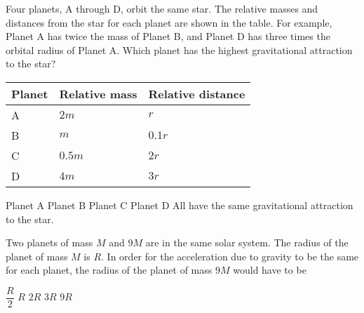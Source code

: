 \documentclass{../../oss-apphys-exam}
\begin{document}
\begin{multicols*}{2}
\begin{questions}
    \question Four planets, A through D, orbit the same star. The relative
    masses and distances from the star for each planet are shown in the table.
    For example, Planet A has twice the mass of Planet B, and Planet D has
    three times the orbital radius of Planet A. Which planet has the highest
    gravitational attraction to the star?
    \begin{center}
      \vspace{-.1in}
      \begin{tabular}{lll}
        \hline
        \textbf{Planet} & \textbf{Relative mass} & \textbf{Relative distance}\\
        \hline
        A\hspace{.4in}& $2m$     & $r$    \\ \hline
        B & $m$                  & $0.1r$\hspace{.25in} \\ \hline
        C & $0.5m$\hspace{.25in} & $2r$   \\ \hline
        D & $4m$                 & $3r$   \\ \hline
      \end{tabular}
    \end{center}
    \begin{choices}
      \choice Planet A
      \choice Planet B
      \choice Planet C
      \choice Planet D
      \choice All have the same gravitational attraction to the star.
    \end{choices}
    \vspace{.7in}
    
    \question Two planets of mass $M$ and $9M$ are in the same solar system. The
    radius of the planet of mass $M$ is $R$. In order for the acceleration due
    to gravity to be the same for each planet, the radius of the planet of mass
    $9M$ would have to be
    \begin{choices}
      \choice $\dfrac R2$
      \choice $R$
      \choice $2R$
      \choice $3R$
      \choice $9R$
    \end{choices}
    

\end{questions}
\end{multicols*}
\end{document}
